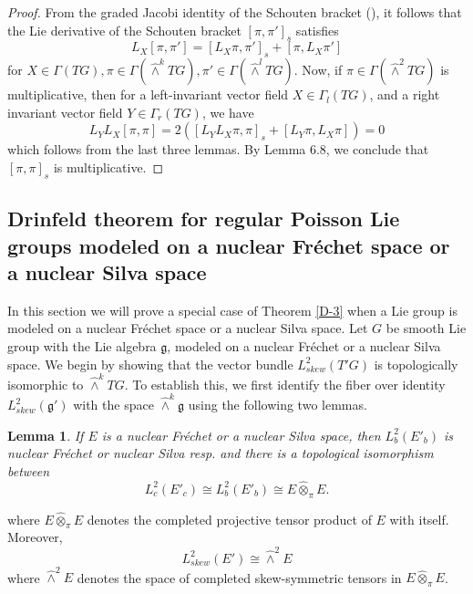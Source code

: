 \documentclass[11pt,reqno]{amsart}
\newtheorem{lemma}[theorem]{Lemma}
\theoremstyle{definition}
\numberwithin{equation}{section}
\begin{document}
\begin{proof}
From the graded Jacobi identity of the Schouten bracket (\cite[Theorem 1.4]{24}), it follows that the Lie derivative of the Schouten bracket $[\pi, \pi']_s$ satisfies
\[
L_X[\pi, \pi'] = [L_X\pi, \pi']_s + [\pi, L_X\pi']
\]
for $X \in \Gamma(TG), \pi \in \Gamma(\hat\wedge^k TG), \pi' \in \Gamma(\hat\wedge^l TG)$. Now, if $\pi \in \Gamma(\hat\wedge^2 TG)$ is multiplicative, then for a left-invariant vector field $X \in \Gamma_l(TG)$, and a right invariant vector field $Y \in \Gamma_r(TG)$, we have
\[
L_Y L_X[\pi, \pi] = 2([L_Y L_X\pi, \pi]_s + [L_Y\pi, L_X\pi]) = 0
\]
which follows from the last three lemmas. By Lemma 6.8, we conclude that $[\pi, \pi]_s$ is multiplicative.
\end{proof}


\subsection{Drinfeld theorem for regular Poisson Lie groups modeled on a nuclear Fréchet space or a nuclear Silva space}
In this section we will prove a special case of Theorem \ref{D-3} when a Lie group is modeled on a nuclear Fréchet space or a nuclear Silva space.
Let $G$ be smooth Lie group with the Lie algebra $\mathfrak g$, modeled on a nuclear Fr\'echet or a nuclear Silva space.   We begin by showing that the vector bundle $L^2_{skew}(T'G)$ is topologically isomorphic to $\hat\wedge^k TG$. To establish this, we first identify the fiber over identity $L^2_{skew}(\mathfrak g')$ with the space $\hat\wedge^k \mathfrak g$ using the following two lemmas.
\begin{lemma}
If $E$ is a nuclear Fréchet or a nuclear Silva space, then $L^2_b(E'_b)$ is nuclear Fréchet or nuclear Silva resp. and there is a topological isomorphism between
\[
L^2_c(E'_c) \cong L^2_b(E'_b) \cong E \hat{\otimes}_{\pi} E.
\]
\end{lemma}
where $E \hat{\otimes}_{\pi} E$ denotes the completed projective tensor product of $E$ with itself. Moreover, \[ L^2_{skew}(E')\cong \hat\wedge^2E\] where $\hat\wedge^2E$ denotes the space of completed skew-symmetric tensors in $E \hat{\otimes}_{\pi} E$.
\end{document}
